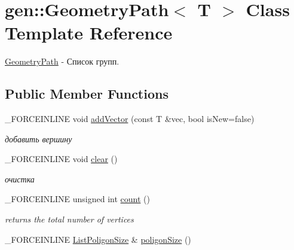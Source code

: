 \hypertarget{classgen_1_1_geometry_path}{\section{gen\-:\-:Geometry\-Path$<$ T $>$ Class Template Reference}
\label{classgen_1_1_geometry_path}
}


\hyperlink{classgen_1_1_geometry_path}{Geometry\-Path} -\/ Список групп.  


\subsection*{Public Member Functions}
\begin{DoxyCompactItemize}
\item 
\hypertarget{classgen_1_1_geometry_path_a829e2cf8226d6e52a4c8c0eff045e546}{\-\_\-\-F\-O\-R\-C\-E\-I\-N\-L\-I\-N\-E void \hyperlink{classgen_1_1_geometry_path_a829e2cf8226d6e52a4c8c0eff045e546}{add\-Vector} (const T \&vec, bool is\-New=false)}\label{classgen_1_1_geometry_path_a829e2cf8226d6e52a4c8c0eff045e546}

\begin{DoxyCompactList}\small\item\em добавить вершину \end{DoxyCompactList}\item 
\hypertarget{classgen_1_1_geometry_path_ace3349bf907447ae9d54b48c187a0ab9}{\-\_\-\-F\-O\-R\-C\-E\-I\-N\-L\-I\-N\-E void \hyperlink{classgen_1_1_geometry_path_ace3349bf907447ae9d54b48c187a0ab9}{clear} ()}\label{classgen_1_1_geometry_path_ace3349bf907447ae9d54b48c187a0ab9}

\begin{DoxyCompactList}\small\item\em очистка \end{DoxyCompactList}\item 
\hypertarget{classgen_1_1_geometry_path_ae68fcefe5338027f8944f76d53d391ba}{\-\_\-\-F\-O\-R\-C\-E\-I\-N\-L\-I\-N\-E unsigned int \hyperlink{classgen_1_1_geometry_path_ae68fcefe5338027f8944f76d53d391ba}{count} ()}\label{classgen_1_1_geometry_path_ae68fcefe5338027f8944f76d53d391ba}

\begin{DoxyCompactList}\small\item\em returns the total number of vertices \end{DoxyCompactList}\item 
\hypertarget{classgen_1_1_geometry_path_a4da13ef48b221e132f6a140ce609cda4}{\-\_\-\-F\-O\-R\-C\-E\-I\-N\-L\-I\-N\-E \hyperlink{classbt_1_1_vector}{List\-Poligon\-Size} \& \hyperlink{classgen_1_1_geometry_path_a4da13ef48b221e132f6a140ce609cda4}{poligon\-Size} ()}\label{classgen_1_1_geometry_path_a4da13ef48b221e132f6a140ce609cda4}


\end{DoxyCompactItemize}
